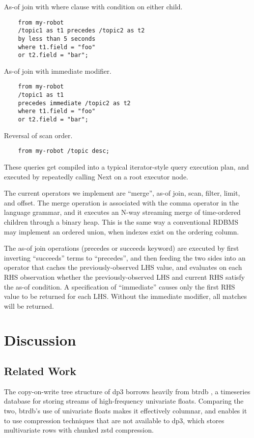 \documentclass[9pt,twocolumn]{article}
\newcommand{\q}[1]{``#1''}
\begin{document}
    As-of join with where clause with condition on either child.
    \begin{lstlisting}
    from my-robot
    /topic1 as t1 precedes /topic2 as t2
    by less than 5 seconds
    where t1.field = "foo"
    or t2.field = "bar";
    \end{lstlisting}

    As-of join with immediate modifier.
    \begin{lstlisting}
    from my-robot
    /topic1 as t1
    precedes immediate /topic2 as t2
    where t1.field = "foo"
    or t2.field = "bar";
    \end{lstlisting}

    Reversal of scan order.
    \begin{lstlisting}
    from my-robot /topic desc;
    \end{lstlisting}

    These queries get compiled into a typical iterator-style query execution plan,
    and executed by repeatedly calling Next on a root executor node.

    The current operators we implement are \q{merge}, as-of join, scan, filter,
    limit, and offset. The merge operation is associated with the comma operator
    in the language grammar, and it executes an N-way streaming merge of
    time-ordered children through a binary heap. This is the same way a
    conventional RDBMS may implement an ordered union, when indexes exist on the
    ordering column.

    The as-of join operations (precedes or succeeds keyword) are executed by first
    inverting \q{succeeds} terms to \q{precedes}, and then feeding the two sides
    into an operator that caches the previously-observed LHS value, and evaluates
    on each RHS observation whether the previously-observed LHS and current RHS
    satisfy the as-of condition. A specification of \q{immediate} causes only the
    first RHS value to be returned for each LHS. Without the immediate modifier,
    all matches will be returned.

    \section{Discussion}

    \subsection{Related Work}
    The copy-on-write tree structure of dp3 borrows heavily from btrdb
    \cite{Andersen}, a timeseries database for storing streams of
    high-frequency univariate floats. Comparing the two, btrdb's use of
    univariate floats makes it effectively columnar, and enables it to use
    compression techniques that are not available to dp3, which stores
    multivariate rows with chunked zstd compression.
\end{document}
